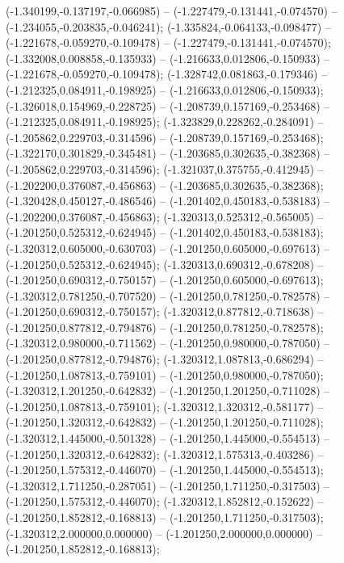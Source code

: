  (-1.340199,-0.137197,-0.066985) -- (-1.227479,-0.131441,-0.074570) -- (-1.234055,-0.203835,-0.046241);
 (-1.335824,-0.064133,-0.098477) -- (-1.221678,-0.059270,-0.109478) -- (-1.227479,-0.131441,-0.074570);
 (-1.332008,0.008858,-0.135933) -- (-1.216633,0.012806,-0.150933) -- (-1.221678,-0.059270,-0.109478);
 (-1.328742,0.081863,-0.179346) -- (-1.212325,0.084911,-0.198925) -- (-1.216633,0.012806,-0.150933);
 (-1.326018,0.154969,-0.228725) -- (-1.208739,0.157169,-0.253468) -- (-1.212325,0.084911,-0.198925);
 (-1.323829,0.228262,-0.284091) -- (-1.205862,0.229703,-0.314596) -- (-1.208739,0.157169,-0.253468);
 (-1.322170,0.301829,-0.345481) -- (-1.203685,0.302635,-0.382368) -- (-1.205862,0.229703,-0.314596);
 (-1.321037,0.375755,-0.412945) -- (-1.202200,0.376087,-0.456863) -- (-1.203685,0.302635,-0.382368);
 (-1.320428,0.450127,-0.486546) -- (-1.201402,0.450183,-0.538183) -- (-1.202200,0.376087,-0.456863);
 (-1.320313,0.525312,-0.565005) -- (-1.201250,0.525312,-0.624945) -- (-1.201402,0.450183,-0.538183);
 (-1.320312,0.605000,-0.630703) -- (-1.201250,0.605000,-0.697613) -- (-1.201250,0.525312,-0.624945);
 (-1.320313,0.690312,-0.678208) -- (-1.201250,0.690312,-0.750157) -- (-1.201250,0.605000,-0.697613);
 (-1.320312,0.781250,-0.707520) -- (-1.201250,0.781250,-0.782578) -- (-1.201250,0.690312,-0.750157);
 (-1.320312,0.877812,-0.718638) -- (-1.201250,0.877812,-0.794876) -- (-1.201250,0.781250,-0.782578);
 (-1.320312,0.980000,-0.711562) -- (-1.201250,0.980000,-0.787050) -- (-1.201250,0.877812,-0.794876);
 (-1.320312,1.087813,-0.686294) -- (-1.201250,1.087813,-0.759101) -- (-1.201250,0.980000,-0.787050);
 (-1.320312,1.201250,-0.642832) -- (-1.201250,1.201250,-0.711028) -- (-1.201250,1.087813,-0.759101);
 (-1.320312,1.320312,-0.581177) -- (-1.201250,1.320312,-0.642832) -- (-1.201250,1.201250,-0.711028);
 (-1.320312,1.445000,-0.501328) -- (-1.201250,1.445000,-0.554513) -- (-1.201250,1.320312,-0.642832);
 (-1.320312,1.575313,-0.403286) -- (-1.201250,1.575312,-0.446070) -- (-1.201250,1.445000,-0.554513);
 (-1.320312,1.711250,-0.287051) -- (-1.201250,1.711250,-0.317503) -- (-1.201250,1.575312,-0.446070);
 (-1.320312,1.852812,-0.152622) -- (-1.201250,1.852812,-0.168813) -- (-1.201250,1.711250,-0.317503);
 (-1.320312,2.000000,0.000000) -- (-1.201250,2.000000,0.000000) -- (-1.201250,1.852812,-0.168813);
